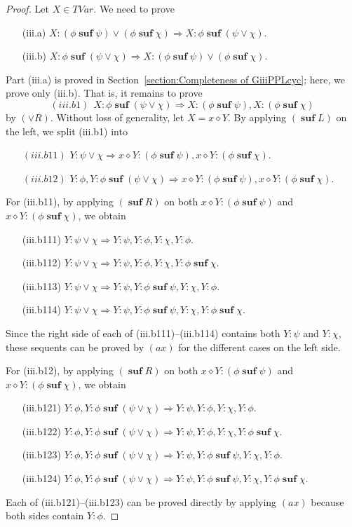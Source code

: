 \documentclass[manuscript,screen]{acmart}
\newcommand{\cat}[0]{\diamond}
\DeclareMathOperator{\osuf}{\mathbf{suf}}
\newcommand{\TVar}[0]{\textit{TVar}}
\begin{document}
\begin{proof}
Let $X\in \TVar$. 
We need to prove 
\begin{enumerate}
\item[(iii.a)] $X : (\phi\osuf \psi)\vee (\phi\osuf \chi)\Rightarrow X : \phi\osuf (\psi\vee \chi)$.
\item[(iii.b)]  $X : \phi\osuf (\psi\vee \chi)\Rightarrow X : (\phi\osuf \psi)\vee (\phi\osuf \chi)$.
\end{enumerate}
Part (iii.a) is proved in Section~\ref{section:Completeness of GiiiPPLcyc}; here, we prove only (iii.b). 
That is, it remains to prove 
$$
(iii.b1)\ \ X : \phi\osuf (\psi\vee \chi)\Rightarrow X : (\phi\osuf \psi), X : (\phi\osuf \chi)
$$
by $(\vee R)$. 
Without loss of generality, let $X = x\cat Y$. 
By applying $(\osuf L)$ on the left, we split (iii.b1) into
\begin{enumerate}
\item[$(iii.b11)$] $Y : \psi\vee \chi\Rightarrow x\cat Y : (\phi\osuf \psi), x\cat Y : (\phi\osuf \chi)$.
\item[$(iii.b12)$]  $Y : \phi, Y : \phi\osuf (\psi\vee \chi)\Rightarrow x\cat Y : (\phi\osuf \psi), x\cat Y : (\phi\osuf \chi)$.
\end{enumerate}
For (iii.b11), by applying $(\osuf R)$ on both $x\cat Y : (\phi\osuf \psi)$ and $x\cat Y : (\phi\osuf \chi)$, we obtain
\begin{enumerate}
\item[(iii.b111)] $Y : \psi\vee \chi\Rightarrow Y : \psi, Y : \phi, Y : \chi, Y : \phi$.
\item[(iii.b112)]  $Y : \psi\vee \chi\Rightarrow Y : \psi, Y : \phi, Y : \chi, Y : \phi\osuf \chi$.
\item[(iii.b113)] $Y : \psi\vee \chi\Rightarrow Y : \psi, Y : \phi\osuf\psi, Y : \chi, Y : \phi$.
\item[(iii.b114)]  $Y : \psi\vee \chi\Rightarrow Y : \psi, Y : \phi\osuf\psi, Y : \chi, Y : \phi\osuf \chi$. 
\end{enumerate}

Since the right side of each of (iii.b111)--(iii.b114) contains both $Y : \psi$ and $Y:\chi$, these sequents can be proved by $(ax)$ for the different cases on the left side. 

For (iii.b12), by  applying $(\osuf R)$ on both $x\cat Y : (\phi\osuf \psi)$ and $x\cat Y : (\phi\osuf \chi)$, we obtain
\begin{enumerate}
\item[(iii.b121)] $Y : \phi, Y : \phi\osuf (\psi\vee \chi)\Rightarrow Y : \psi, Y : \phi, Y : \chi, Y : \phi$.
\item[(iii.b122)]  $Y : \phi, Y : \phi\osuf (\psi\vee \chi)\Rightarrow Y : \psi, Y : \phi, Y : \chi, Y : \phi\osuf \chi$.
\item[(iii.b123)] $Y : \phi, Y : \phi\osuf (\psi\vee \chi)\Rightarrow Y : \psi, Y : \phi\osuf\psi, Y : \chi, Y : \phi$.
\item[(iii.b124)]  $Y : \phi, Y : \phi\osuf (\psi\vee \chi)\Rightarrow Y : \psi, Y : \phi\osuf\psi, Y : \chi, Y : \phi\osuf \chi$. 
\end{enumerate}
Each of (iii.b121)--(iii.b123) can be proved directly by applying $(ax)$ because both sides contain $Y : \phi$. 


\end{proof}
\end{document}
